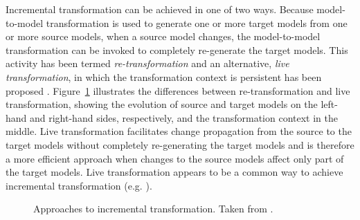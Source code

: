 Incremental transformation can be achieved in one of two ways. Because model-to-model transformation is used to generate one or more target models from one or more source models, when a source model changes, the model-to-model transformation can be invoked to completely re-generate the target models. This \cc activity has been termed \emph{re-transformation} and an alternative, \emph{live transformation}, in which the transformation context is persistent has been proposed \cite{hearnden06incremental}. Figure~\ref{fig:incremental_transformation_types} illustrates the differences between re-transformation and live transformation, showing the evolution of source and target models on the left-hand and right-hand sides, respectively, and the transformation context in the middle. Live transformation facilitates change propagation from the source to the target models without completely re-generating the target models and is therefore a more efficient approach when changes to the source models affect only part of the target models. Live \cc transformation appears to be a common way to achieve incremental transformation (e.g. \cite{rath08live,tratt08change}).

\begin{figure}[htbp]
	\centering
	\caption[Approaches to incremental transformation]{Approaches to incremental transformation. Taken from \cite{hearnden06incremental}.}
\label{fig:incremental_transformation_types}
\end{figure}

